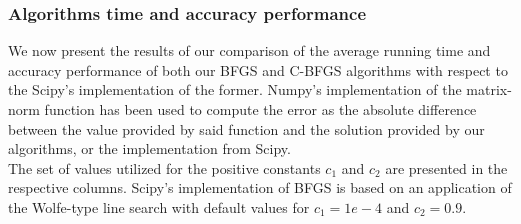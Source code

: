 \documentclass{article}
\numberwithin{equation}{section}
\begin{document}
\subsubsection{Algorithms time and accuracy performance}
We now present the results of our comparison of the average running time and accuracy performance of both our BFGS and C-BFGS algorithms with respect to the Scipy's implementation of the former. Numpy's implementation of the matrix-norm function has been used to compute the error as the absolute difference between the value provided by said function and the solution provided by our algorithms, or the implementation from Scipy.
\\

The set of values utilized for the positive constants $c_1$ and $c_2$ are presented in the respective columns. Scipy's implementation of BFGS is based on an application of the Wolfe-type line search with default values for $c_1=1e-4$ and $c_2=0.9$.
\\
\end{document}
